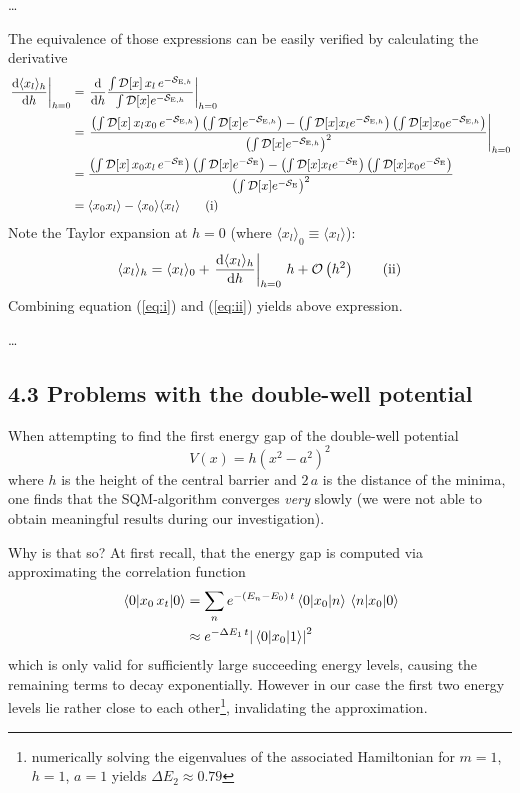 \documentclass[11pt,a4paper]{scrartcl}
\newcommand{\avg}[1]{\langle#1\rangle}
\newcommand{\SE}{\ensuremath{\mathcal{S}_{\mathrm{E}}}}
\newcommand{\SEh}{\mathcal{S}_{\mathrm{E},h}}
\newcommand{\pathinth}[1]{\int\mathcal{D}[x]#1e^{-\SEh}}
\newcommand{\pathint}[1]{\int\mathcal{D}[x]#1e^{-\SE}}
\newcommand{\BigO}[1]{\mathcal{O}\left(#1\right)}
\begin{document}
\dots

The equivalence of those expressions can be easily verified by calculating the
derivative
\begin{align*}
    \eval{\dv{\avg{x_l}_h}{h}}_{h=0} &=
    \eval{\dv{h}\frac{\pathinth{\,x_l\,}}{\pathinth{}}}_{h=0} \\ &=
    \eval{\frac{\left(\pathinth{\,x_l x_0\,}\right)\left(\pathinth{}\right)
    -\left(\pathinth{x_l}\right)\left(\pathinth{x_0}\right)}
    {\left(\pathinth{}\right)^2}}_{h=0} \\ &=
    \frac{\left(\pathint{\,x_0 x_l\,}\right)\left(\pathint{}\right)
    -\left(\pathint{x_l}\right)\left(\pathint{x_0}\right)}
    {\left(\pathint{}\right)^2} \\ &=
    \avg{x_0 x_l}-\avg{x_0}\avg{x_l} \tag{i}\label{eq:i}
\end{align*}
Note the Taylor expansion at $h=0$ (where $\avg{x_l}_0\equiv\avg{x_l}$):
\begin{equation*}
    \avg{x_l}_h=\avg{x_l}_0+\eval{\dv{\avg{x_l}_h}{h}}_{h=0}\,h+\BigO{h^2}
    \tag{ii}\label{eq:ii}
\end{equation*}
Combining equation (\ref{eq:i}) and (\ref{eq:ii}) yields above expression.

\dots


\subsection*{4.3 Problems with the double-well potential}
When attempting to find the first energy gap of the double-well potential
\begin{equation}
    V(x)=h\left(x^2-a^2\right)^2
    \label{eq:double-well}
\end{equation}
where $h$ is the height of the central barrier and $2\,a$ is the distance of the
minima, one finds that the SQM-algorithm converges \emph{very} slowly (we were not
able to obtain meaningful results during our investigation).

Why is that so? At first recall, that the energy gap is computed via
approximating the correlation function
\begin{align*}
    \ev{x_0\,x_t}{0}&=\sum_{n}e^{-(E_n-E_0)\,t}\mel{0}{x_0}{n}\mel{n}{x_0}{0}
    \\&\approx{e^{-\Delta{E_1}\,t}}\abs{\mel{0}{x_0}{1}}^2
\end{align*}
which is only valid for sufficiently large succeeding energy levels, causing
the remaining terms to decay exponentially. However in our case the first two
energy levels lie rather close to each other\footnote{numerically solving the
eigenvalues of the associated Hamiltonian for $m=1$, $h=1$, $a=1$ yields
$\Delta{E_2}\approx0.79$}, invalidating the approximation.
\end{document}

